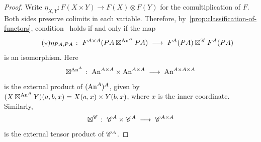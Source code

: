 \documentclass[english,svgnames,table]{article}
\begin{document}
\begin{proof}
        Write $\eta_{X,Y} \colon F(X \times Y) \to F(X) \otimes F(Y)$ for the comultiplication of $F$. Both sides preserve colimits in each variable. Therefore, by~\cref{prop:classification-of-functors}, condition~ holds if and only if the map
        \begin{equation} \label{eq:oplax-monoidal-map} \tag{$\star$}
            \eta_{P A, P A} \;\colon\; F^{A \times A}(P A \boxtimes^{\mathrm{An}^A} P A) \;\longrightarrow\; F^A(P A) \boxtimes^{\mathscr{C}} F^A(P A)
        \end{equation}
        is an isomorphism. Here
        \begin{equation*}
            \boxtimes^{\mathrm{An}^A} \;\colon\; \mathrm{An}^{A \times A} \times \mathrm{An}^{A \times A} \;\longrightarrow\; \mathrm{An}^{A \times A \times A}
        \end{equation*}
        is the external product of $(\mathrm{An}^A)^A$, given by $(X\boxtimes^{\mathrm{An}^A}Y)(a,b,x)=X(a,x)\times Y(b,x)$, where $x$ is the inner coordinate. Similarly,
        \begin{equation*}
            \boxtimes^{\mathscr{C}} \;\colon\; \mathscr{C}^A \times \mathscr{C}^A \;\longrightarrow\; \mathscr{C}^{A \times A}
        \end{equation*}
        is the external tensor product of $\mathscr{C}^A$.


\end{proof}
\end{document}
